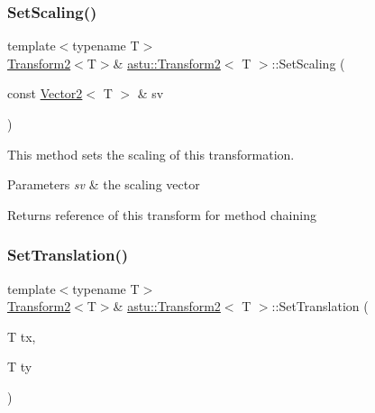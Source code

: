 \subsubsection{\texorpdfstring{Set\+Scaling()}{SetScaling()}\hspace{0.1cm}{\footnotesize\ttfamily [2/2]}}
{\footnotesize\ttfamily template$<$typename T$>$ \\
\hyperlink{classastu_1_1Transform2}{Transform2}$<$T$>$\& \hyperlink{classastu_1_1Transform2}{astu\+::\+Transform2}$<$ T $>$\+::Set\+Scaling (\begin{DoxyParamCaption}\item[{const \hyperlink{classastu_1_1Vector2}{Vector2}$<$ T $>$ \&}]{sv }\end{DoxyParamCaption})\hspace{0.3cm}{\ttfamily [inline]}}

This method sets the scaling of this transformation.


\begin{DoxyParams}{Parameters}
{\em sv} & the scaling vector \\
\hline
\end{DoxyParams}
\begin{DoxyReturn}{Returns}
reference of this transform for method chaining 
\end{DoxyReturn}
\mbox{\label{classastu_1_1Transform2_a94d83e295cc5fa029d17a2e2dfc0a6fc}} 
\subsubsection{\texorpdfstring{Set\+Translation()}{SetTranslation()}\hspace{0.1cm}{\footnotesize\ttfamily [1/2]}}
{\footnotesize\ttfamily template$<$typename T$>$ \\
\hyperlink{classastu_1_1Transform2}{Transform2}$<$T$>$\& \hyperlink{classastu_1_1Transform2}{astu\+::\+Transform2}$<$ T $>$\+::Set\+Translation (\begin{DoxyParamCaption}\item[{T}]{tx,  }\item[{T}]{ty }\end{DoxyParamCaption})\hspace{0.3cm}{\ttfamily [inline]}}

